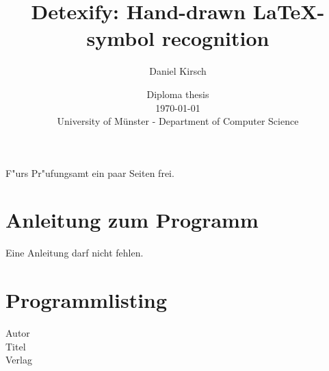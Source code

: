 \documentclass[12pt]{book}
\begin{document}
\frontmatter

\title{Detexify: Hand-drawn \LaTeX-symbol recognition}

\author{Daniel Kirsch}

\date{\vspace{10mm} Diploma thesis\\ \vspace{3mm} \today \\
\vspace{20mm}
\vspace{3mm} University of Münster - Department of Computer Science}

\maketitle


\rule{0mm}{1mm}
\newpage
\rule{0mm}{1mm}
\newpage

F"urs Pr"ufungsamt ein paar Seiten frei.

\tableofcontents



\mainmatter


\newpage

\backmatter

\appendix



\chapter{Anleitung zum Programm}

Eine Anleitung darf nicht fehlen.

\chapter{Programmlisting}

\begin{tiny}




\end{tiny}

\begin{thebibliography}{90}

Autor\\
Titel\\
Verlag\\

\end{thebibliography}


\end{document}
